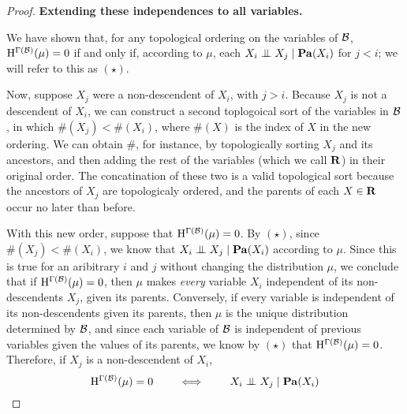 \documentclass{article}
\newcommand\Pa{\mathbf{Pa}}
\numberwithin{equation}{section}
\begin{document}
\begin{proof}
		\textbf{Extending these independences to all variables.}
		
		We have shown that, for any topological ordering on the variables of $\cal B$, $\mathrm{H}^{\Gamma(\cal B)}(\mu) = 0$ if and only if, according to $\mu$,  each $X_i \CI X_j \mid \Pa(X_i)$ for $j  < i$; we will refer to this as $(\star)$.
		
		Now, suppose $X_j$ were a non-descendent of $X_i$, with $j > i$. Because $X_j$ is not a descendent of $X_i$, we can construct a second toplogoical sort of the variables in $\cal B$, in which $\#(X_j) < \#(X_i)$, where $\#(X)$ is the index of $X$ in the new ordering. 
		We can obtain $\#$, for instance, by topologically sorting $X_j$ and its ancestors, and then adding the rest of the variables (which we call $\bf R$) in their original order. The concatination of these two is a valid topological sort because the ancestors of $X_j$ are topologicaly ordered, and the parents of each $X \in \bf R$ occur no later than before.
		
		
		With this new order, suppose that $\mathrm{H}^{\Gamma(\cal B)}(\mu) = 0$. By $(\star)$, since $\#(X_j) < \#(X_i)$, we know that $X_i \CI X_j \mid \Pa(X_i)$ according to $\mu$. Since this is true for an aribitrary $i$ and $j$ without changing the distribution $\mu$, we conclude that if $\mathrm{H}^{\Gamma(\cal B)}(\mu) = 0$, then $\mu$ makes \emph{every} variable $X_i$ independent of its non-descendents $X_j$, given its parents.
		Conversely, if every variable is independent of its non-descendents given its parents, then $\mu$ is the unique distribution determined by $\cal B$, and since each variable of $\cal B$ is independent of previous variables given the values of its parents,  we know by $(\star)$ that $\mathrm{H}^{\Gamma(\cal B)}(\mu) = 0$. Therefore, if $X_j$ is a non-descendent of $X_i$, 
		\[ \H^{\Gamma(\cal B)}(\mu) = 0 \qquad\iff\qquad X_i \CI X_j \mid \Pa(X_i) \] 
		

\end{proof}
\end{document}
